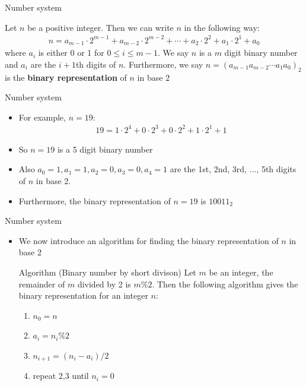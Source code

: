 \documentclass[10pt,xcolor={table,dvipsnames},t]{beamer}
\begin{document}
\begin{frame}{Number system}
  \begin{definition}
    Let $n$ be a positive integer. Then we can write $n$ in the following way:
    \begin{align*}
      n =  a_{m-1} \cdot 2^{m-1} + a_{m-2} \cdot 2^{m-2} + \cdots + a_{2} \cdot 2^2 + a_{1} \cdot 2^{1} + a_{0}
    \end{align*}
    where $a_i$ is either 0 or 1 for $0\leq i \leq m-1$. We say $n$ is a $m$ digit binary number and $a_i$ are the $i+1$th digits of $n$. Furthermore, we say $n = (a_{m-1}a_{m-2} \cdots a_{1} a_{0})_2$ is the \textbf{binary representation} of $n$ in base $2$
  \end{definition}
\end{frame}

\begin{frame}{Number system}
  \begin{itemize}
    \item For example, $n=19$:
    \begin{align*}
      19 = 1 \cdot 2^4 + 0 \cdot 2^3 + 0 \cdot 2^2 + 1 \cdot 2^1 + 1
    \end{align*}
    \item So $n=19$ is a 5 digit binary number 
    \item Also $a_0=1,a_1=1,a_2=0,a_3=0,a_4=1$ are the 1st, 2nd, 3rd, ..., 5th digits of $n$ in base 2. 
    \item Furthermore, the binary representation of $n=19$ is $10011_2$
  \end{itemize}
\end{frame}

\begin{frame}[fragile]{Number system}
  \begin{itemize}
    \item We now introduce an algorithm for finding the binary representation of $n$ in base 2
    \begin{exampleblock}{Algorithm (Binary number by short divison)}
      Let $m$ be an integer, the remainder of $m$ divided by 2 is $m \% 2$. Then the following algorithm gives the binary representation for an integer $n$:
      \begin{enumerate}
        \item $n_0 = n$
        \item $a_i = n_i \% 2$
        \item $n_{i+1} = (n_i - a_i) / 2$
        \item repeat 2,3 until $n_i = 0$ 
      \end{enumerate}
    \end{exampleblock}
  \end{itemize}
\end{frame}
\end{document}

